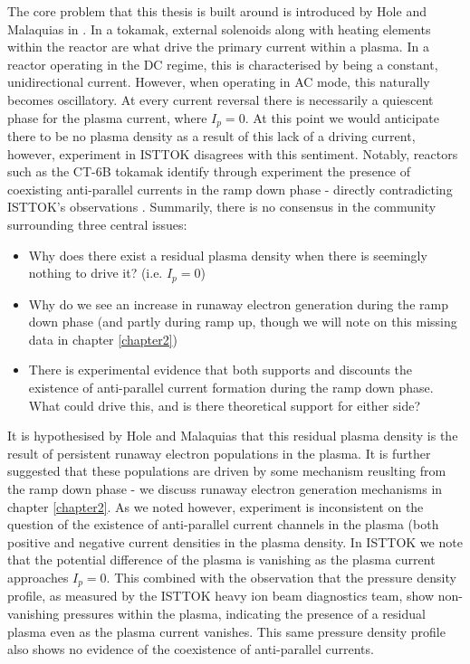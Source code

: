 The core problem that this thesis is built around is introduced by Hole and Malaquias in \cite{malaquias-matthew}.
In a tokamak, external solenoids along with heating elements within the reactor are 
what drive the primary current within a plasma. In a reactor operating in the DC regime, this is 
characterised by being a constant, unidirectional current. However, when operating in AC mode, 
this naturally becomes oscillatory. At every current reversal there is necessarily a quiescent phase 
for the plasma current, where $I_{p} = 0$. At this point we would anticipate there to be no plasma density 
as a result of this lack of a driving current, however, experiment in ISTTOK disagrees with this sentiment. 
Notably, reactors such as the CT-6B tokamak identify through experiment the presence of coexisting anti-parallel 
currents in the ramp down phase - directly contradicting ISTTOK's observations \cite{huang-ct-tokamak}. 
Summarily, there is no consensus in the community surrounding three central issues:
\begin{itemize}
    \item Why does there exist a residual plasma density when there is seemingly nothing to drive it? (i.e. $I_p = 0$)
    \item Why do we see an increase in runaway electron generation during the ramp down phase (and partly during 
    ramp up, though we will note on this missing data in chapter \ref{chapter2})
    \item There is experimental evidence that both supports and discounts the existence of anti-parallel current
    formation during the ramp down phase. What could drive this, and is there theoretical support for either side?
\end{itemize}

It is hypothesised by Hole and Malaquias that this residual plasma density is the result of 
persistent runaway electron populations in the plasma. It is further suggested that these populations
are driven by some mechanism reuslting from the ramp down phase - we discuss runaway electron generation 
mechanisms in chapter \ref{chapter2}. As we noted however, experiment is inconsistent on the question of 
the existence of anti-parallel current channels in the plasma (both positive and negative current densities 
in the plasma density. In ISTTOK we note that the potential difference of the plasma is vanishing as the plasma 
current approaches $I_p = 0$. This combined with the observation that the pressure density profile, as measured 
by the ISTTOK heavy ion beam diagnostics team, show non-vanishing pressures within the plasma, indicating 
the presence of a residual plasma even as the plasma current vanishes. This same pressure density profile 
also shows no evidence of the coexistence of anti-parallel currents.

